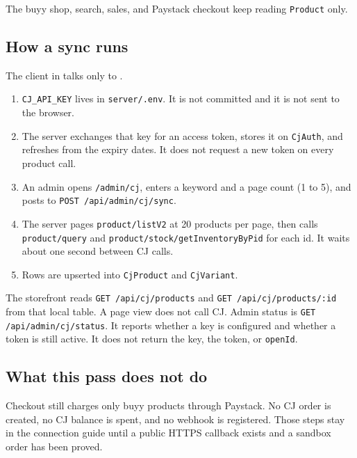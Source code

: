 \documentclass[11pt]{article}
\begin{document}
The buyy shop, search, sales, and Paystack checkout keep reading \texttt{Product} only.

\subsection{How a sync runs}

The client in  talks only to .

\begin{enumerate}
  \item \texttt{CJ\_API\_KEY} lives in \texttt{server/.env}. It is not committed and it is not sent to the browser.
  \item The server exchanges that key for an access token, stores it on \texttt{CjAuth}, and refreshes from the expiry dates. It does not request a new token on every product call.
  \item An admin opens \texttt{/admin/cj}, enters a keyword and a page count (1 to 5), and posts to \texttt{POST /api/admin/cj/sync}.
  \item The server pages \texttt{product/listV2} at 20 products per page, then calls \texttt{product/query} and \texttt{product/stock/getInventoryByPid} for each id. It waits about one second between CJ calls.
  \item Rows are upserted into \texttt{CjProduct} and \texttt{CjVariant}.
\end{enumerate}

The storefront reads \texttt{GET /api/cj/products} and \texttt{GET /api/cj/products/:id} from that local table. A page view does not call CJ. Admin status is \texttt{GET /api/admin/cj/status}. It reports whether a key is configured and whether a token is still active. It does not return the key, the token, or \texttt{openId}.

\subsection{What this pass does not do}

Checkout still charges only buyy products through Paystack. No CJ order is created, no CJ balance is spent, and no webhook is registered. Those steps stay in the connection guide until a public HTTPS callback exists and a sandbox order has been proved.
\end{document}
